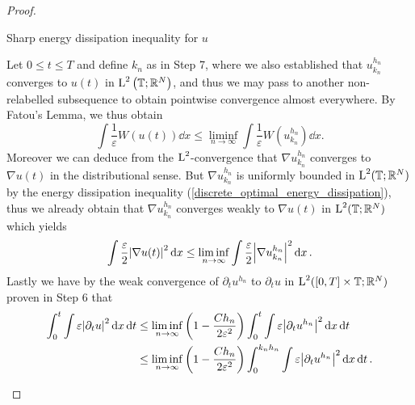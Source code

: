 \begin{proof}
\begin{description}[wide=0pt]
		\item[Step 8:] Sharp energy dissipation inequality for $ u $
		
		Let $ 0 \leq t \leq T $ and define $ k_{ n } $ as in Step 7, where we 
		also established that $ u_{ k_{ n } }^{ h_{ n } } $ converges to $ u ( 
		t ) $ in $ \operatorname{L}^{ 2 } \left( \operatorname{\mathbb{T}} ; \mathbb{ R }^{ N } \right) $, 
		and thus we may pass to another non-relabelled subsequence to obtain 
		pointwise convergence almost everywhere. By Fatou's Lemma, we thus 
		obtain
		\begin{equation*}
			\int
			\frac{ 1 }{ \varepsilon }
			W ( u ( t ) ) 
			\dd{ x }
			\leq
			\liminf_{ n \to \infty }
			\int
			\frac{ 1 }{ \varepsilon }
			W ( u_{ k_{ n } }^{ h_{ n } } )
			\dd{ x }.
		\end{equation*}
		Moreover we can deduce from the $ \operatorname{L}^{ 2 } $-convergence that $ \nabla 
		u_{ k_{ n } }^{ h_{ n } } $ converges to $ \nabla u( t ) $ in the 
		distributional sense. But $ \nabla u_{ k_{ n } }^{ h_{ n } } $ is 
		uniformly bounded in $ \operatorname{L}^{ 2 } ( \operatorname{\mathbb{T}} ; \mathbb{ R }^{ N } ) $ 
		by the energy dissipation inequality 
		(\ref{discrete_optimal_energy_dissipation}), thus we already obtain 
		that $ \nabla u_{ k_{ n } }^{ h_{ n } } $ converges weakly to $ \nabla 
		u ( t ) $ in $ \operatorname{L}^{ 2 } ( \operatorname{\mathbb{T}}; \mathbb{ R }^{ N } ) $ which 
		yields
		\begin{equation*}
			\int 
			\frac{ \varepsilon }{ 2 }
			\abs{ \nabla u ( t ) }^{ 2 }
			\dd{ x }
			\leq
			\liminf_{ n \to \infty }
			\int
			\frac{ \varepsilon }{ 2 }
			\abs{ \nabla u_{ k_{ n } }^{ h_{ n } } }^{ 2 }
			\dd{ x }.
		\end{equation*}
		Lastly we have by the weak convergence of $ \partial_{ t } u^{ h_{n } } 
		$ to $ \partial_{ t} u $ in $\operatorname{L}^{ 2 } ( [ 0, T ] \times  \operatorname{\mathbb{T}} ; 
		\mathbb{ R }^{ N } ) $ proven in Step 6 that
		\begin{align*}
			\int_{ 0 }^{ t }
			\int
			\varepsilon
			\abs{ \partial_{ t } u }^{ 2 }
			\dd{ x }
			\dd{ t }
			& \leq
			\liminf_{ n \to \infty }
			\left( 1 - \frac{ C h_{ n } }{ 2 \varepsilon^{ 2 } } \right)
			\int_{ 0 }^{ t }
			\int
			\varepsilon
			\abs{ \partial_{ t } u^{ h_{ n } } }^{ 2 }
			\dd{ x }
			\dd{ t }
			\\
			& \leq
			\liminf_{ n \to \infty }
			\left( 1 - \frac{ C h_{ n } }{ 2 \varepsilon^{ 2 } } \right)
			\int_{ 0 }^{ k_{ n } h_{ n } }
			\int
			\varepsilon
			\abs{ \partial_{ t } u^{ h_{ n } } }^{ 2 }
			\dd{ x }
			\dd{ t }.		
		\end{align*}

\end{description}
\end{proof}
